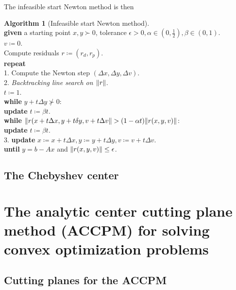 \documentclass[11pt]{amsart}
\theoremstyle{definition}
\newtheorem{algorithm}{Algorithm}
\theoremstyle{remark}
\newcommand{\ind}{\hspace*{0.5cm}}
\begin{document}
    The infeasible start Newton method is then
    \begin{algorithm}[Infeasible start Newton method]
    \label{a:basic_conceptual_cp_alg}\mbox{}\\
        \ind \textbf{given} a starting point $x, y \succ 0$, tolerance $\epsilon > 0, \alpha \in (0, \frac{1}{2}), \beta \in (0, 1)$. \\
        \ind $v \coloneqq 0$. \\
        \ind Compute residuals $r \coloneqq (r_d, r_p)$. \\
        \ind \textbf{repeat} \\
        \ind\ind 1. Compute the Newton step $(\Delta x, \Delta y, \Delta v)$. \\
        \ind\ind 2. \emph{Backtracking line search on $\norm{r}$}. \\
        \ind\ind\ind $t \coloneqq 1$. \\
        \ind\ind\ind \textbf{while } $y + t\Delta y \not\succ 0$: \\
        \ind\ind\ind\ind \textbf{update } $t \coloneqq \beta t$. \\
        \ind\ind\ind \textbf{while} $\norm{r(x + t\Delta x, y + t \delta y, v + t \Delta v} > (1 - \alpha t)\norm{r(x, y, v)}$: \\
        \ind\ind\ind\ind \textbf{update } $t \coloneqq \beta t$. \\
        \ind\ind 3. \textbf{update} $x \coloneqq x +  t\Delta x, y \coloneqq y + t \Delta y, v \coloneqq v + t \Delta v.$ \\
        \ind \textbf{until} $y = b - Ax$ and $\norm{r(x, y, v)} \leq \epsilon$.
    \end{algorithm}

    \subsection{The Chebyshev center}\label{ss:computing_cc}

\section{The analytic center cutting plane method (ACCPM) for solving convex optimization problems}\label{s:accpm}
    \subsection{Cutting planes for the ACCPM}\label{ss:accpm_cp}
\end{document}
